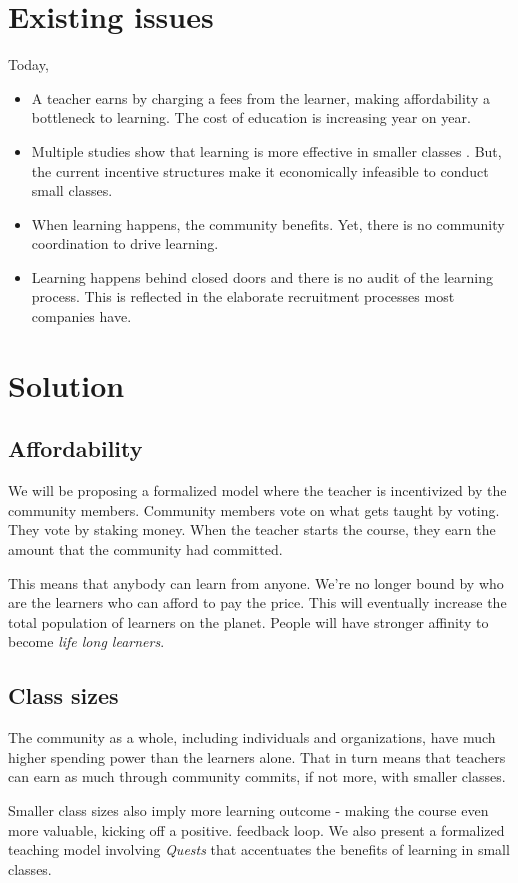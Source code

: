 \documentclass{article}
\begin{document}
  \section{Existing issues} 
    Today,
    \begin{itemize}
      \item A teacher earns by charging a fees from the learner, making affordability a bottleneck to learning. The cost of education is increasing year on year. \cite{feesincrease}
      \item Multiple studies show that learning is more effective in smaller classes \cite{starresearch}. 
        But, the current incentive structures make it economically infeasible to conduct small classes. %
      \item When learning happens, the community benefits. Yet, there is no community coordination to drive learning. %
      \item Learning happens behind closed doors and there is no audit of the learning process. This is reflected in the elaborate recruitment processes most companies have. \cite{roundsofinterviewcount}
    \end{itemize}

  \section{Solution}
    \subsection{Affordability}
      We will be proposing a formalized model where the teacher is incentivized by the community members. Community members vote on what gets taught by voting. They vote by staking money. When the teacher starts the course, they earn the amount that the community had committed.
      \par
      This means that anybody can learn from anyone. We're no longer bound by who are the learners who can afford to pay the price. This will eventually increase the total population of learners on the planet. People will have stronger affinity to become \textit{life long learners}.
    \subsection{Class sizes}
      The community as a whole, including individuals and organizations, have much higher spending power than the learners alone. That in turn means that teachers can earn as much through community commits, if not more, with smaller classes.
      \par
      Smaller class sizes also imply more learning outcome \cite{classsize} - making the course even more valuable, kicking off a positive. feedback loop. We also present a formalized teaching model involving \textit{Quests} that accentuates the benefits of learning in small classes.
\end{document}
